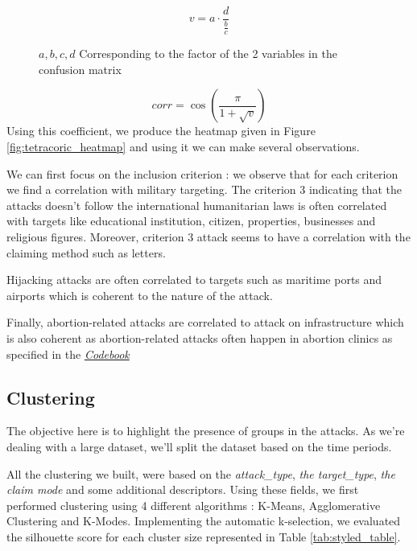 \documentclass{article}
\begin{document}
\begin{figure}[htbp]
    \centering
    \[
        v = a \cdot \frac{d}{\frac{b}{c}}
    \]

    \vspace{1em}
    \centering
    $a, b, c, d$  Corresponding to the factor of the 2 variables in the confusion matrix 
\end{figure}

$$
    corr = \cos\left(\frac{\pi}{1+\sqrt{v}}\right)
$$
Using this coefficient, we produce the heatmap given in Figure \ref{fig:tetracoric_heatmap} and using it we can make several observations.

We can first focus on the inclusion criterion : we observe that for each criterion we find a correlation with military targeting. The criterion 3 indicating that the attacks doesn't follow the international humanitarian laws is often correlated with targets like educational institution, citizen, properties, businesses and religious figures. Moreover, criterion 3 attack seems to have a correlation with the claiming method such as letters.

Hijacking attacks are often correlated to targets such as maritime ports and airports which is coherent to the nature of the attack.

Finally, abortion-related attacks are correlated to attack on infrastructure which is also coherent as abortion-related attacks often happen in abortion clinics as specified in the \href{https://github.com/ekomlenovic/SecurityDataset/blob/main/data/Codebook.pdf}{\textit{Codebook}}

\subsection{Clustering}

The objective here is to highlight the presence of groups in the attacks. As we're dealing with a large dataset, we'll split the dataset based on the time periods.

All the clustering we built, were based on the \textit{attack\_type}, \textit{the target\_type}, \textit{the claim mode} and some additional descriptors. Using these fields, we first performed clustering using 4 different algorithms : K-Means\cite{WikipediaKMeans}, Agglomerative Clustering\cite{WikipediaHierarchicalClustering} and K-Modes\cite{Huang1998}. Implementing the automatic k-selection, we evaluated the silhouette score for each cluster size represented in Table \ref{tab:styled_table}. 
\end{document}
